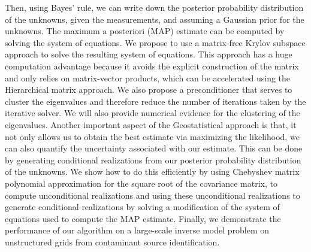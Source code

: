 \documentclass{report}
\begin{document}
Then, using Bayes' rule, we can write down the posterior probability
distribution of the unknowns, given the measurements, and assuming a
Gaussian prior for the unknowns. The maximum a posteriori (MAP) estimate
can be computed by solving the system of equations. We propose to use a
matrix-free Krylov subspace approach to solve the resulting system of
equations. This approach has a huge computation advantage because it
avoids the explicit construction of the matrix and only relies on
matrix-vector products, which can be accelerated using the Hierarchical
matrix approach. We also propose a preconditioner that serves to cluster
the eigenvalues and therefore reduce the number of iterations taken by
the iterative solver. We will also provide numerical evidence for the
clustering of the eigenvalues. Another important aspect of the
Geostatistical approach is that, it not only allows us to obtain the best
estimate via maximizing the likelihood, we can also quantify the
uncertainty associated with our estimate. This can be done by generating
conditional realizations from our posterior probability distribution of
the unknowns. We show how to do this efficiently by using Chebyshev
matrix polynomial approximation for the square root of the covariance
matrix, to compute unconditional realizations and using these
unconditional realizations to generate conditional realizations by
solving a modification of the system of equations used to compute the MAP
estimate. Finally, we demonstrate the performance of our algorithm on a
large-scale inverse model problem on unstructured grids from contaminant
source identification.
\end{document}
